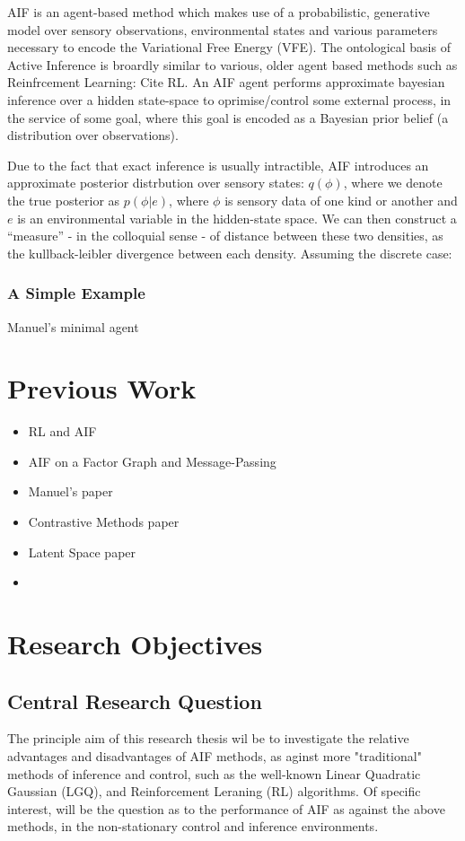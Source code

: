 \documentclass[12pt, twoside]{report}
\begin{document}
AIF is an agent-based method which makes use of a probabilistic, generative model over sensory observations, environmental states and various parameters necessary to encode the Variational Free Energy (VFE). The ontological basis of Active Inference is broardly similar to various, older agent based methods such as Reinfrcement Learning: Cite RL. An AIF  agent performs approximate bayesian inference over a hidden state-space to oprimise/control some external process, in the service of some goal, where this goal is encoded as a Bayesian prior belief (a distribution over observations). 


Due to the fact that exact inference is usually intractible, AIF introduces an approximate posterior distrbution over sensory states: $q(\phi)$, where we denote the true posterior as $p(\phi | e)$, where $\phi$ is sensory data of one kind or another and $e$ is an environmental variable in the hidden-state space. We can then construct a ``measure'' - in the colloquial sense - of distance between these two densities, as the kullback-leibler divergence between each density. Assuming the discrete case: 

\subsubsection{A Simple Example}
Manuel's minimal agent



\section{Previous Work}
\begin{itemize}
\item RL and AIF
\item AIF on a Factor Graph and Message-Passing
\item Manuel's paper
\item Contrastive Methods paper
\item Latent Space paper
\item \textcite{Bandits}
\end{itemize}



\section{Research Objectives}


\subsection{Central Research Question}
The principle aim of this research thesis wil be to investigate the relative advantages and disadvantages of AIF methods, as aginst more "traditional" methods of inference and control, such as the well-known Linear Quadratic Gaussian (LGQ), and Reinforcement Leraning (RL) algorithms. Of specific interest, will be the question as to the performance of AIF as against the above methods, in the non-stationary control and inference environments.  
\end{document}
